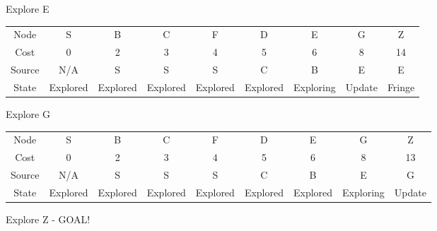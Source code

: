 \documentclass{article}
\begin{document}
\begin{enumerate}
        
        Explore E
        \newline
        \begin{left}
            \begin{tabular}{c|c|c|c|c|c|c|c|c}
            \hline
                Node & S & B & C & F & D & E & G & Z\\
                Cost & 0 & 2 & 3 & 4 & 5 & 6 & 8 & 14\\
                Source & N/A & S & S & S & C & B & E & E\\
                State & Explored & Explored & Explored & Explored & Explored & Exploring & Update & Fringe\\
            \hline
            \end{tabular}
        \end{left}
        \newline
        \newline
        
        
        Explore G
        \newline
        \begin{left}
            \begin{tabular}{c|c|c|c|c|c|c|c|c}
            \hline
                Node & S & B & C & F & D & E & G & Z\\
                Cost & 0 & 2 & 3 & 4 & 5 & 6 & 8 & 13\\
                Source & N/A & S & S & S & C & B & E & G\\
                State & Explored & Explored & Explored & Explored & Explored & Explored & Exploring & Update\\
            \hline
            \end{tabular}
        \end{left}
        
        \newline
        \newline
        
        Explore Z - GOAL!
        
        
        

\end{enumerate}
\end{document}
